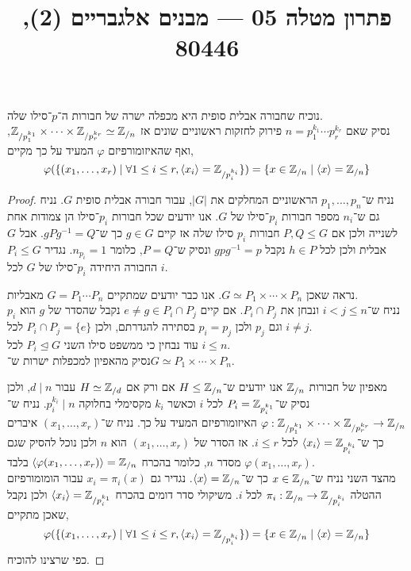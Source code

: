 
\title{פתרון מטלה 05 --- מבנים אלגבריים (2), 80446}


\maketitle
\maketitleprint[red]

\question{}
\subquestion{}
נוכיח שחבורה אבלית סופית היא מכפלה ישרה של חבורות ה־$p$־סילו שלה. \\
נסיק שאם $n = p_1^{k_1} \cdots p_r^{k_r}$ פירוק לחזקות ראשוניים שונים אז $\mathbb{Z}_{/ p_1^{k_1}} \times \cdots \times \mathbb{Z}_{/ p_r^{k_r}} \simeq \mathbb{Z}_{/n}$,
ואף שהאיזומורפיזם $\varphi$ המעיד על כך מקיים,
\[
	\varphi(\{ (x_1, \ldots, x_r) \mid \forall 1 \le i \le r, \langle x_i \rangle = \mathbb{Z}_{/ p_i^{k_i}} \})
	= \{ x \in \mathbb{Z}_{/n} \mid \langle x \rangle = \mathbb{Z}_{/n} \}
\]
\begin{proof}
	נניח ש־$p_1, \ldots, p_n$ הראשוניים המחלקים את $|G|$, עבור חבורה אבלית סופית $G$.
	נניח גם ש־$n_i$ מספר חבורות $p_i$־סילו של $G$.
	אנו יודעים שכל חבורות $p_i$־סילו הן צמודות אחת לשנייה ולכן אם $P, Q \le G$ חבורות $p_i$ סילו שלה אז קיים $g \in G$ כך ש־$g P g^{-1} = Q$.
	אבל $G$ אבלית ולכן לכל $h \in P$ נקבל $g p g^{-1} = p$ ונסיק ש־$P = Q$, כלומר $n_{p_i} = 1$.
	נגדיר $P_i \le G$ החבורה היחידה $p_i$־סילו של $G$ לכל $i$.

	נראה שאכן $G \simeq P_1 \times \cdots \times P_n$.
	אנו כבר יודעים שמתקיים $G = P_1 \cdots P_n$ מאבליות. \\
	נניח ש־$i < j \le n$ ונבחן את $P_i \cap P_j$.
	אם קיים $e \ne g \in P_i \cap P_j$ נקבל שהסדר של $g$ הוא $p_i$ וגם $p_j$ ולכן $p_i = p_j$ בסתירה להגדרתם, ולכן $P_i \cap P_j = \{ e \}$ לכל $i \ne j$. \\
	עוד נבחין כי ממשפט סילו השני $P_i \trianglelefteq G$ לכל $i \le n$. \\
	נסיק מהאפיון למכפלות ישרות ש־$G \simeq P_1 \times \cdots \times P_n$.

	מאפיון של חבורות $\mathbb{Z}_{/n}$ אנו יודעים ש־$H \le \mathbb{Z}_{/n}$ אם ורק אם $H \simeq \mathbb{Z}_{/d}$ עבור $d \mid n$, ולכן נסיק ש־$P_i = \mathbb{Z}_{p_i^{k_1}}$ לכל $i$ וכאשר $k_i$ מקסימלי בחלוקה $p_i^{k_i} \mid n$.
	נניח ש־$\varphi : \mathbb{Z}_{/ p_1^{k_1}} \times \cdots \times \mathbb{Z}_{/ p_r^{k_r}} \to \mathbb{Z}_{/n}$ האיזומורפיזם המעיד על כך.
	נניח ש־$(x_1, \ldots, x_r)$ איברים כך ש־$\langle x_i \rangle = \mathbb{Z}_{p_i^{k_i}}$ לכל $i \le r$.
	אז הסדר של $(x_1, \ldots, x_r)$ הוא $n$ ולכן נוכל להסיק שגם $\varphi(x_1, \ldots, x_r)$ מסדר $n$, כלומר בהכרח $\langle \varphi(x_1, \ldots, x_r) \rangle = \mathbb{Z}_{/n}$ בלבד. \\
	מהצד השני נניח ש־$x \in \mathbb{Z}_{/n}$ כך ש־$\langle x \rangle = \mathbb{Z}_{/n}$.
	נגדיר גם $x_i = \pi_i(x)$ עבור הומומורפיזם ההטלה $\pi_i : \mathbb{Z}_{/n} \to \mathbb{Z}_{/p_i^{k_i}}$ לכל $i$.
	משיקולי סדר דומים בהכרח $\langle x_i \rangle = \mathbb{Z}_{/p_i^{k_1}}$ ולכן נקבל שאכן מתקיים,
	\[
		\varphi(\{ (x_1, \ldots, x_r) \mid \forall 1 \le i \le r, \langle x_i \rangle = \mathbb{Z}_{/ p_i^{k_i}} \})
		= \{ x \in \mathbb{Z}_{/n} \mid \langle x \rangle = \mathbb{Z}_{/n} \}
	\]
	כפי שרצינו להוכיח.
\end{proof}

